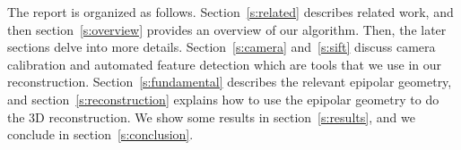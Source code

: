 The report is organized as follows. Section~\ref{s:related} describes related work, and then section~\ref{s:overview} provides an overview of our algorithm. Then, the later sections delve into more details. Section~\ref{s:camera} and~\ref{s:sift} discuss camera calibration and automated feature detection which are tools that we use in our reconstruction. Section~\ref{s:fundamental} describes the relevant epipolar geometry, and section~\ref{s:reconstruction} explains how to use the epipolar geometry to do the 3D reconstruction. We show some results in section~\ref{s:results}, and we conclude in section~\ref{s:conclusion}.
